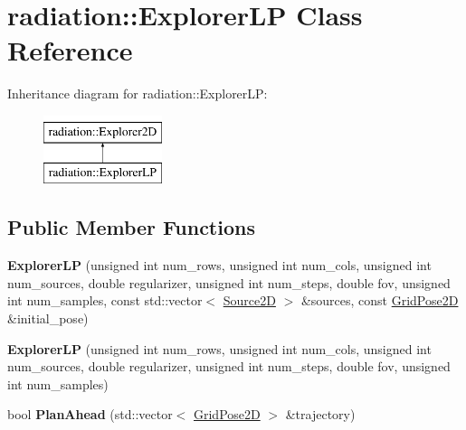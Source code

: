 \hypertarget{classradiation_1_1_explorer_l_p}{}\section{radiation\+:\+:Explorer\+LP Class Reference}
\label{classradiation_1_1_explorer_l_p}
Inheritance diagram for radiation\+:\+:Explorer\+LP\+:\begin{figure}[H]
\begin{center}
\leavevmode
\includegraphics[height=2.000000cm]{classradiation_1_1_explorer_l_p}
\end{center}
\end{figure}
\subsection*{Public Member Functions}
\begin{DoxyCompactItemize}
\item 
\hypertarget{classradiation_1_1_explorer_l_p_ac650cf72509513325bb4672fa97dd6ae}{}\label{classradiation_1_1_explorer_l_p_ac650cf72509513325bb4672fa97dd6ae} 
{\bfseries Explorer\+LP} (unsigned int num\+\_\+rows, unsigned int num\+\_\+cols, unsigned int num\+\_\+sources, double regularizer, unsigned int num\+\_\+steps, double fov, unsigned int num\+\_\+samples, const std\+::vector$<$ \hyperlink{classradiation_1_1_source2_d}{Source2D} $>$ \&sources, const \hyperlink{classradiation_1_1_grid_pose2_d}{Grid\+Pose2D} \&initial\+\_\+pose)
\item 
\hypertarget{classradiation_1_1_explorer_l_p_a3d37154001011ae4a81c5ee7d26b8f62}{}\label{classradiation_1_1_explorer_l_p_a3d37154001011ae4a81c5ee7d26b8f62} 
{\bfseries Explorer\+LP} (unsigned int num\+\_\+rows, unsigned int num\+\_\+cols, unsigned int num\+\_\+sources, double regularizer, unsigned int num\+\_\+steps, double fov, unsigned int num\+\_\+samples)
\item 
\hypertarget{classradiation_1_1_explorer_l_p_accde83eac496f12dede4737b8a57ce51}{}\label{classradiation_1_1_explorer_l_p_accde83eac496f12dede4737b8a57ce51} 
bool {\bfseries Plan\+Ahead} (std\+::vector$<$ \hyperlink{classradiation_1_1_grid_pose2_d}{Grid\+Pose2D} $>$ \&trajectory)
\end{DoxyCompactItemize}
